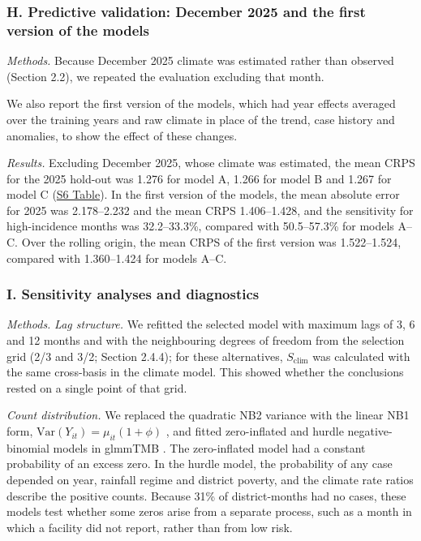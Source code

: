 \documentclass[11pt,a4paper]{article}
\begin{document}
\subsubsection*{H. Predictive validation: December 2025 and the first version of the models}

\emph{Methods.} Because December 2025 climate was estimated rather than observed (Section 2.2), we repeated the evaluation excluding that month.

We also report the first version of the models, which had year effects averaged over the training years and raw climate in place of the trend, case history and anomalies, to show the effect of these changes.

\emph{Results.} Excluding December 2025, whose climate was estimated, the mean CRPS for the 2025 hold-out was 1.276 for model A, 1.266 for model B and 1.267 for model C (\hyperref[s6table]{S6 Table}). In the first version of the models, the mean absolute error for 2025 was 2.178--2.232 and the mean CRPS 1.406--1.428, and the sensitivity for high-incidence months was 32.2--33.3\%, compared with 50.5--57.3\% for models A--C. Over the rolling origin, the mean CRPS of the first version was 1.522--1.524, compared with 1.360--1.424 for models A--C.

\label{s1text-i}

\subsubsection*{I. Sensitivity analyses and diagnostics}

\emph{Methods.} \emph{Lag structure.} We refitted the selected model with maximum lags of 3, 6 and 12 months and with the neighbouring degrees of freedom from the selection grid (2/3 and 3/2; Section 2.4.4); for these alternatives, \(S_{\text{clim}}\) was calculated with the same cross-basis in the climate model. This showed whether the conclusions rested on a single point of that grid.

\emph{Count distribution.} We replaced the quadratic NB2 variance with the linear NB1 form, \(\mathrm{Var}(Y_{it}) = \mu_{it}(1+\phi)\) \cite{ref26}, and fitted zero-inflated \cite{ref28} and hurdle negative-binomial models \cite{ref26} in glmmTMB \cite{ref35}. The zero-inflated model had a constant probability of an excess zero. In the hurdle model, the probability of any case depended on year, rainfall regime and district poverty, and the climate rate ratios describe the positive counts. Because 31\% of district-months had no cases, these models test whether some zeros arise from a separate process, such as a month in which a facility did not report, rather than from low risk.
\end{document}
